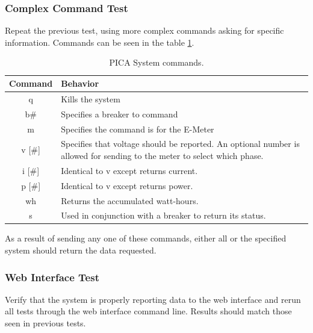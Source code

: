 \subsubsection{Complex Command Test}
Repeat the previous test, using more complex commands asking for specific information. Commands can be seen in the table \ref{tab:pica_system_commands}.
\begin{table}[htbp]
  \centering
  \begin{tabular}{|c|p{2in}|}\hline
    Command & Behavior \\\hline\hline
    q     & Kills the system \\\hline
    b\#    & Specifies a breaker to command\\\hline
    m     & Specifies the command is for the E-Meter\\\hline
    v [\#] & Specifies that voltage should be reported. An optional number is allowed for sending to the meter to select which phase.\\\hline
    i [\#] & Identical to v except returns current.\\\hline
    p [\#] & Identical to v except returns power.\\\hline
    wh    & Returns the accumulated watt-hours.\\\hline
    s     & Used in conjunction with a breaker to return its status.\\\hline
  \end{tabular}
  \caption{PICA System commands.}
  \label{tab:pica_system_commands}
\end{table}
As a result of sending any one of these commands, either all or the specified system should return the data requested.

\subsubsection{Web Interface Test}
Verify that the system is properly reporting data to the web interface and rerun all tests through the web interface command line. Results should match those seen in previous tests.



